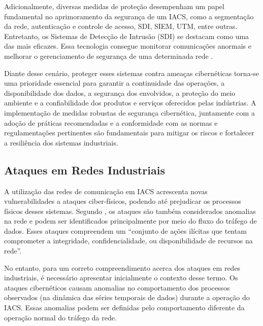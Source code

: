     Adicionalmente, diversas medidas de proteção desempenham um papel fundamental no aprimoramento da segurança de um IACS, como a segmentação da rede, autenticação e controle de acesso, SDI, SIEM, UTM, entre outras. Entretanto, os Sistemas de Detecção de Intrusão (SDI) se destacam como uma das mais eficazes. Essa tecnologia consegue monitorar comunicações anormais e melhorar o gerenciamento de segurança de uma determinada rede \cite{shi2021}. %

    Diante desse cenário, proteger esses sistemas contra ameaças cibernéticas torna-se uma prioridade essencial para garantir a continuidade das operações, a disponibilidade dos dados, a segurança dos envolvidos, a proteção do meio ambiente e a confiabilidade dos produtos e serviços oferecidos pelas indústrias. A implementação de medidas robustas de segurança cibernética, juntamente com a adoção de práticas recomendadas e a conformidade com as normas e regulamentações pertinentes são fundamentais para mitigar os riscos e fortalecer a resiliência dos sistemas industriais. %

    \subsection{Ataques em Redes Industriais} \label{subsec:tiposAtaques}

    A utilização das redes de comunicação em IACS acrescenta novas vulnerabilidades a ataques ciber-físicos, podendo até prejudicar os processos físicos desses sistemas. Segundo \cite{turcato2020}, os ataques são também considerados anomalias na rede e podem ser identificados principalmente por meio do fluxo do tráfego de dados. Esses ataques compreendem um “conjunto de ações ilícitas que tentam comprometer a integridade, confidencialidade, ou disponibilidade de recursos na rede”.

    No entanto, para um correto compreendimento acerca dos ataques em redes industriais, é necessário apresentar inicialmente o contexto desse termo. Os ataques cibernéticos causam anomalias no comportamento dos processos observados (na dinâmica das séries temporais de dados) durante a operação do IACS. Essas anomalias podem ser definidas pelo comportamento diferente da operação normal do tráfego da rede.

